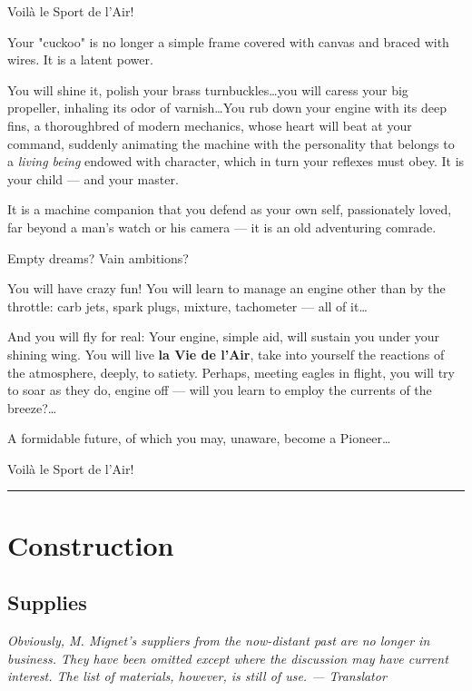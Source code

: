 \documentclass{book}
\newcommand*\sectline{
  \vspace{5pt}
  \begin{center}
    \rule{0.5\linewidth}{\linethickness}
  \end{center}
  \vspace{5pt}
}
\begin{document}
{
  \selectfont
  \begin{center}
    {\huge Voil\`a le Sport de l'Air!}
  \end{center}
}

Your "cuckoo" is no longer a simple frame covered with canvas and
braced with wires. It is a latent power.

You will shine it, polish your brass turnbuckles\ldots you will caress
your big propeller, inhaling its odor of varnish\ldots You rub down
your engine with its deep fins, a thoroughbred of modern mechanics,
whose heart will beat at your command, suddenly animating the machine
with the personality that belongs to a \textit{living being} endowed
with character, which in turn your reflexes must obey. It is your
child --- and your master.

It is a machine companion that you defend as your own self,
passionately loved, far beyond a man's watch or his camera --- it is
an old adventuring comrade.

Empty dreams?  Vain ambitions?

You will have crazy fun! You will learn to manage an engine other than
by the throttle: carb jets, spark plugs, mixture, tachometer --- all
of it\ldots

And you will fly for real: Your engine, simple aid, will sustain you
under your shining wing. You will live \textbf{la Vie de l'Air}, take
into yourself the reactions of the atmosphere, deeply, to satiety.
Perhaps, meeting eagles in flight, you will try to soar as they do,
engine off --- will you learn to employ the currents of the
breeze?\ldots

A formidable future, of which you may, unaware, become a Pioneer\ldots

{
  \selectfont
  \begin{center}
    {\Huge Voil\`a le Sport de l'Air!}
  \end{center}
}

\sectline

\chapter{Construction}

\section{Supplies}

\textit{Obviously, M. Mignet's suppliers from the
  now-distant past are no longer in business.  They have been omitted
  except where the discussion may have current interest.  The list of
  materials, however, is still of use. --- Translator}
\end{document}
